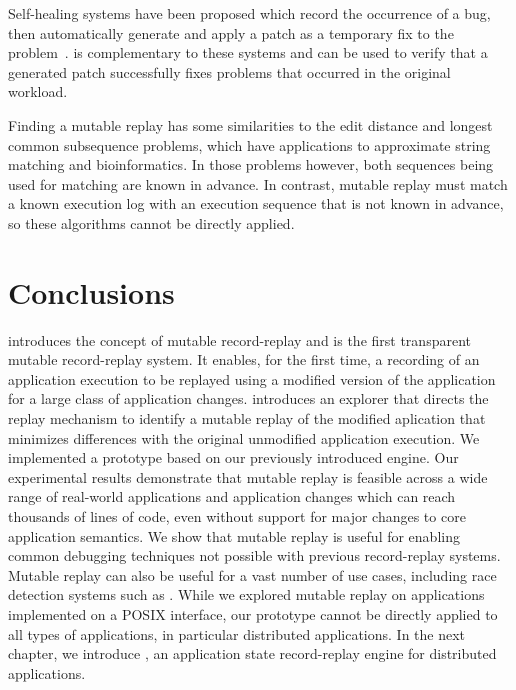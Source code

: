 Self-healing systems have been proposed which 
record the occurrence of a bug, then automatically generate and apply
a patch as a temporary fix to the problem~\cite{assure:asplos09}.
{\dora} is complementary
to these systems and can be used to
verify that a generated patch successfully fixes
problems that occurred in the original workload.

Finding a mutable replay has some similarities
to the edit distance and longest common subsequence
problems, which have applications to approximate string matching and
bioinformatics. In those problems however, both
sequences being used for matching are known in advance. In contrast,
mutable replay must match a known execution log with an
execution sequence that is not known in advance, so these algorithms cannot be
directly applied.

\section{Conclusions}
\label{dora:sec:conclusion}

{\dora} introduces the concept of mutable record-replay and is the first
transparent mutable record-replay system.  It enables, for the first time, a
recording of an application execution to be replayed using a modified version of
the application for a large class of application changes.  {\dora} introduces an
explorer that directs the replay mechanism to identify a mutable replay of the
modified aplication that minimizes differences with the original unmodified
application execution.
We implemented a \dora prototype based on our previously introduced \scribe engine.
Our experimental results demonstrate that
mutable replay is feasible across a wide range of real-world applications and
application changes which can reach thousands of lines of code, even without
support for major changes to core application semantics. We show that mutable
replay is useful for enabling common debugging techniques not possible with
previous record-replay systems. Mutable replay can also be useful for a vast
number of use cases, including race detection systems such as \racepro.
While we explored mutable replay on applications implemented on a POSIX
interface, our \dora prototype cannot be directly applied to all types of
applications, in particular distributed applications. In the next chapter, we
introduce \synapse, an application state record-replay engine for distributed
applications.
